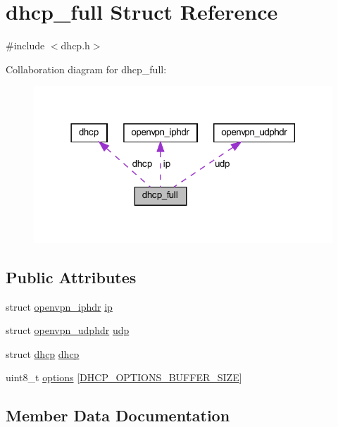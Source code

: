 \hypertarget{structdhcp__full}{}\section{dhcp\+\_\+full Struct Reference}
\label{structdhcp__full}


{\ttfamily \#include $<$dhcp.\+h$>$}



Collaboration diagram for dhcp\+\_\+full\+:
\nopagebreak
\begin{figure}[H]
\begin{center}
\leavevmode
\includegraphics[width=318pt]{structdhcp__full__coll__graph}
\end{center}
\end{figure}
\subsection*{Public Attributes}
\begin{DoxyCompactItemize}
\item 
struct \hyperlink{structopenvpn__iphdr}{openvpn\+\_\+iphdr} \hyperlink{structdhcp__full_ae7929b1f4d783e190e16ab02496627dc}{ip}
\item 
struct \hyperlink{structopenvpn__udphdr}{openvpn\+\_\+udphdr} \hyperlink{structdhcp__full_a04131a0760b62cb22902d629ce3af538}{udp}
\item 
struct \hyperlink{structdhcp}{dhcp} \hyperlink{structdhcp__full_a09fb9e25414b72a8c98b066658ce5620}{dhcp}
\item 
uint8\+\_\+t \hyperlink{structdhcp__full_a38a739413e13f836ec73fd62f15a8ccf}{options} \mbox{[}\hyperlink{dhcp_8h_a6ec8dd2b7188de82eaf3602fbab9bbeb}{D\+H\+C\+P\+\_\+\+O\+P\+T\+I\+O\+N\+S\+\_\+\+B\+U\+F\+F\+E\+R\+\_\+\+S\+I\+Z\+E}\mbox{]}
\end{DoxyCompactItemize}


\subsection{Member Data Documentation}
\hypertarget{structdhcp__full_a09fb9e25414b72a8c98b066658ce5620}{}
